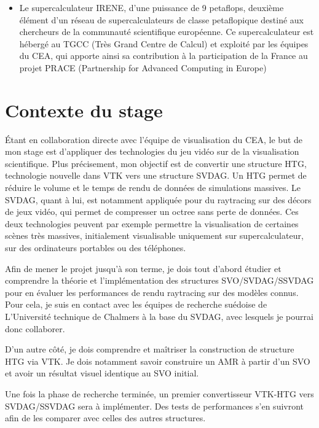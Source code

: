 \documentclass[12pt,a4paper,twoside]{article}
\begin{document}
\begin{itemize}[label=\textbullet]
        \item
        Le supercalculateur IRENE, d’une puissance de 9 petaflops, deuxième élément d’un réseau de supercalculateurs de classe petaflopique destiné aux chercheurs de la communauté scientifique européenne. Ce supercalculateur est hébergé au TGCC (Très Grand Centre de Calcul) et exploité par les équipes du CEA, qui apporte ainsi sa contribution à la participation de la France au projet PRACE (Partnership for Advanced Computing in Europe)

    \end{itemize}



    \newpage


    \newpage
    \section{Contexte du stage}                 %

    Étant en collaboration directe avec l'équipe de visualisation du CEA, le but de mon stage est d'appliquer
    des technologies du jeu vidéo sur de la visualisation scientifique. Plus précisement, mon objectif est de convertir
    une structure HTG, technologie nouvelle dans VTK vers une structure SVDAG.
    Un HTG permet de réduire le volume et le temps de rendu de données de simulations massives. Le SVDAG, quant à lui, est notamment appliquée pour
    du raytracing sur des décors de jeux vidéo, qui permet de compresser un octree sans perte de données. Ces deux technologies peuvent par exemple
    permettre la visualisation de certaines scènes très massives, initialement visualisable uniquement sur supercalculateur, sur des ordinateurs portables ou des téléphones.

    Afin de mener le projet jusqu'à son terme, je dois tout d'abord étudier et comprendre la théorie et l'implémentation des structures
    SVO/SVDAG/SSVDAG pour en évaluer les performances de rendu raytracing sur des modèles connus. Pour cela, je suis en contact
    avec les équipes de recherche suédoise de L'Université technique de Chalmers à la base du SVDAG, avec lesquels je pourrai donc collaborer.

    D'un autre côté, je dois comprendre et maîtriser la construction de structure HTG via VTK. Je dois notamment
    savoir construire un AMR à partir d'un SVO et avoir un résultat visuel identique au SVO initial.

    Une fois la phase de recherche terminée, un premier convertisseur VTK-HTG vers SVDAG/SSVDAG sera à
    implémenter. Des tests de performances s'en suivront afin de les comparer avec celles des autres structures.
\end{document}

